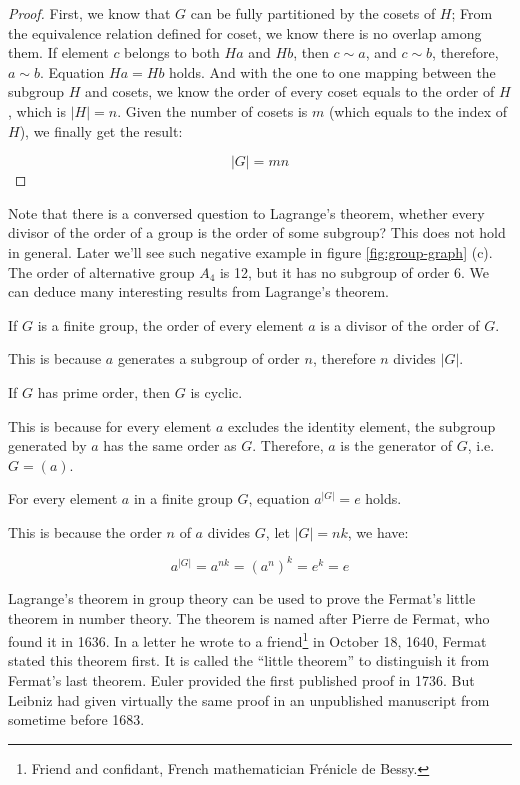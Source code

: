 \documentclass{article}
\begin{document}
\begin{proof}
First, we know that $G$ can be fully partitioned by the cosets of $H$; From the equivalence relation defined for coset, we know there is no overlap among them. If element $c$ belongs to both $Ha$ and $Hb$, then $c \sim a$, and $c \sim b$, therefore, $a \sim b$. Equation $Ha = Hb$ holds. And with the one to one mapping between the subgroup $H$ and cosets, we know the order of every coset equals to the order of $H$, which is $|H| = n$. Given the number of cosets is $m$ (which equals to the index of $H$), we finally get the result:

\[
|G| = mn
\]
\end{proof}

Note that there is a conversed question to Lagrange's theorem, whether every divisor of the order of a group is the order of some subgroup? This does not hold in general. Later we'll see such negative example in figure \ref{fig:group-graph} (c). The order of alternative group $A_4$ is 12, but it has no subgroup of order 6. We can deduce many interesting results from Lagrange's theorem.

\begin{corollary}
If $G$ is a finite group, the order of every element $a$ is a divisor of the order of $G$.
\end{corollary}

This is because $a$ generates a subgroup of order $n$, therefore $n$ divides $|G|$.

\begin{corollary}
If $G$ has prime order, then $G$ is cyclic.
\end{corollary}

This is because for every element $a$ excludes the identity element, the subgroup generated by $a$ has the same order as $G$. Therefore, $a$ is the generator of $G$, i.e. $G = (a)$.

\begin{corollary}
For every element $a$ in a finite group $G$, equation $a^{|G|} = e$ holds.
\label{corollary:Lagrange-elem-order}
\end{corollary}

This is because the order $n$ of $a$ divides $G$, let $|G| = nk$, we have:

\[
a^{|G|} = a^{nk} = (a^n)^k = e^k = e
\]

Lagrange's theorem in group theory can be used to prove the Fermat's little theorem in number theory. The theorem is named after Pierre de Fermat, who found it in 1636. In a letter he wrote to a friend\footnote{Friend and confidant, French mathematician Frénicle de Bessy.} in October 18, 1640, Fermat stated this theorem first. It is called the ``little theorem'' to distinguish it from Fermat's last theorem. Euler provided the first published proof in 1736. But Leibniz had given virtually the same proof in an unpublished manuscript from sometime before 1683.
\end{document}
